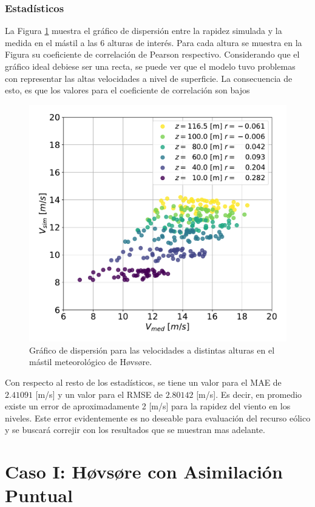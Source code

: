 \subsubsection{Estadísticos}
La Figura \ref{fig:06_corr_hov} muestra el gráfico de dispersión entre la rapidez simulada y la medida en el mástil a las 6 alturas de interés. Para cada altura se muestra en la Figura su coeficiente de correlación de Pearson respectivo. Considerando que el gráfico ideal debiese ser una recta, se puede ver que el modelo tuvo problemas con representar las altas velocidades a nivel de superficie. La consecuencia de esto, es que los valores para el coeficiente de correlación son bajos
\begin{figure}[H]
	\centering
	\includegraphics[width=0.55\linewidth,page=1,trim={0cm 0cm 0cm 0cm},clip]{Imagenes/06/hov/corr}%
	\caption{Gráfico de dispersión para las velocidades a distintas alturas en el mástil meteorológico de Høvsøre.}
	\label{fig:06_corr_hov}
\end{figure}

Con respecto al resto de los estadísticos, se tiene un valor para el MAE de $2.41091$ [m/s] y un valor para el RMSE de $2.80142$ [m/s]. Es decir, en promedio existe un error de aproximadamente 2 [m/s] para la rapidez del viento en los niveles. Este error evidentemente es no deseable para evaluación del recurso eólico y se buscará correjir con los resultados que se muestran mas adelante.













\newpage
\section{Caso I: Høvsøre con Asimilación Puntual}
